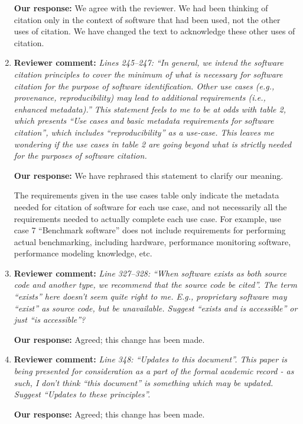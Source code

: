 \documentclass{article}
\begin{document}
\begin{enumerate}
\textbf{Our response:}
We agree with the reviewer. We had been thinking of citation only in the context of software that had been used, not the other uses of citation. We have changed the text to acknowledge these other uses of citation.

\item \textbf{Reviewer comment:}
\emph{Lines 245--247: ``In general, we intend the software citation principles to cover the minimum of what is necessary for software citation for the purpose of software identification. Other use cases (e.g., provenance, reproducibility) may lead to additional requirements (i.e., enhanced metadata).'' This statement feels to me to be at odds with table 2, which presents ``Use cases and basic metadata requirements for software citation'', which includes ``reproducibility'' as a use-case. This leaves me wondering if the use cases in table 2 are going beyond what is strictly needed for the purposes of software citation.}

\textbf{Our response:}
We have rephrased this statement to clarify our meaning.

The requirements given in the use cases table only indicate the metadata needed for citation of software for each use case, and not necessarily all the requirements needed to actually complete each use case. For example, use case 7 ``Benchmark software'' does not include requirements for performing actual benchmarking, including hardware, performance monitoring software, performance modeling knowledge, etc.

\item \textbf{Reviewer comment:}
\emph{Line 327--328: ``When software exists as both source code and another type, we recommend that the source code be cited''. The term ``exists'' here doesn't seem quite right to me. E.g., proprietary software may ``exist'' as source code, but be unavailable. Suggest ``exists and is accessible'' or just ``is accessible''?}

\textbf{Our response:}
Agreed; this change has been made.


\item \textbf{Reviewer comment:}
\emph{Line 348: ``Updates to this document''. This paper is being presented for consideration as a part of the formal academic record - as such, I don't think ``this document'' is something which may be updated. Suggest ``Updates to these principles''.}

\textbf{Our response:}
Agreed; this change has been made.

\end{enumerate}

%
%
\end{document}

